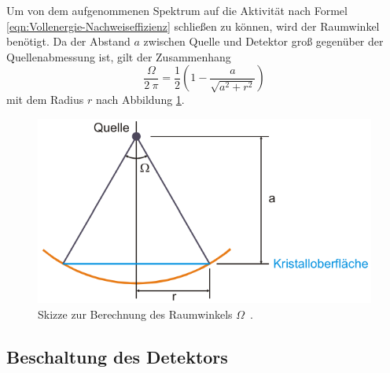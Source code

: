 Um von dem aufgenommenen Spektrum auf die Aktivität nach Formel \eqref{eqn:Vollenergie-Nachweiseffizienz}
schließen zu können, wird der Raumwinkel benötigt.
Da der Abstand $a$ zwischen Quelle und Detektor groß gegenüber der Quellenabmessung
ist, gilt der Zusammenhang
\begin{equation}
	\frac{\Omega}{2\:\pi} = \frac{1}{2} \left(1 - \frac{a}{\sqrt{a^2 + r^2}}\right)
	\label{eqn:Raumwinkel}
\end{equation}
mit dem Radius $r$ nach Abbildung \ref{fig:Raumwinkel}.
\begin{figure}
	\centering
	\includegraphics[width=.65\textwidth]{images/Raumwinkel.pdf}
	\caption{Skizze zur Berechnung des Raumwinkels $\Omega$~\cite[25]{anleitung}.}
	\label{fig:Raumwinkel}
\end{figure}

\subsection{Beschaltung des Detektors}
\label{sec:Schaltungen}

